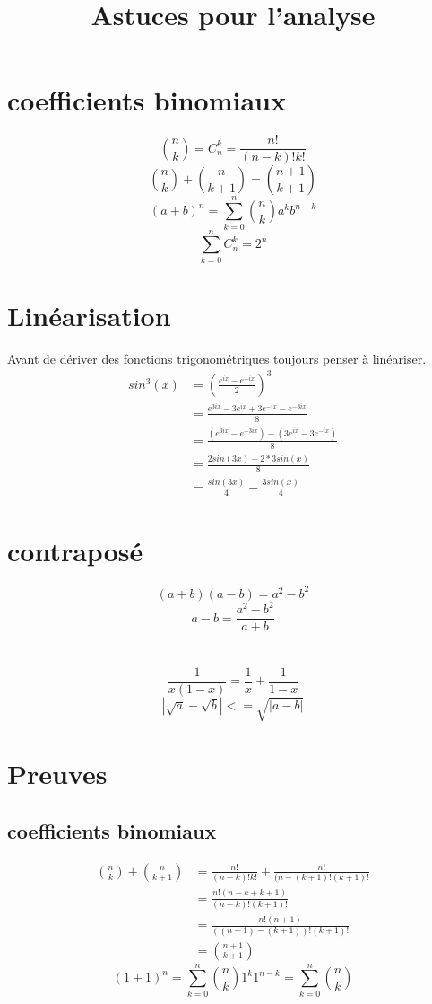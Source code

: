 \documentclass[a4paper,10pt]{article}
\title{Astuces pour l'analyse}
\author{}
\begin{document}
\maketitle

\begin{abstract}

\end{abstract}
\section{coefficients binomiaux}
\[\textstyle{n \choose k} = C^{k}_{n} = \frac{n!}{(n - k)!k!}\]
\[\textstyle{n \choose k} + \textstyle{n \choose k + 1} = \textstyle{n + 1 \choose k + 1}\]
\[(a + b)^{n} = \sum_{k = 0}^{n} \textstyle{n \choose k} a^{k}b^{n - k}\]
\[\sum_{k = 0}^{n} C^{k}_{n} = 2^{n}\]

\section{Linéarisation}
Avant de dériver des fonctions trigonométriques toujours penser à linéariser.
\begin{align*}
sin^{3}(x) &= (\frac{e^{ix} - e^{-ix}}{2})^{3}\\
&= \frac{e^{3ix} - 3e^{ix} + 3e^{-ix} - e^{-3ix}}{8}\\
&= \frac{(e^{3ix} - e^{-3ix}) -(3e^{ix} - 3e^{-ix})}{8}\\
&= \frac{2sin(3x) - 2*3sin(x)}{8}\\
&= \frac{sin(3x)}{4} - \frac{3sin(x)}{4}
\end{align*}
\section{contraposé}
\[(a + b)(a - b) = a^{2} - b^{2}\]
\[a - b = \frac{a^{2} - b^{2}}{a + b}\]
\section{}
\[\frac{1}{x(1 - x)} = \frac{1}{x} + \frac{1}{1 - x}\]
\[|\sqrt{a} - \sqrt{b}| <= \sqrt{|a - b|}\]
\appendix
\section{Preuves}
\subsection{coefficients binomiaux}
\begin{align*}
 \textstyle{n \choose k} + \textstyle{n \choose k + 1} &= \frac{n!}{(n - k)!k!} + \frac{n!}{(n - (k + 1)!(k + 1)!}\\
 &= \frac{n!(n - k + k + 1)}{(n - k)!(k + 1)!}\\
 &= \frac{n!(n + 1)}{((n + 1) - (k + 1))!(k + 1)!}\\
 &= \textstyle{n + 1 \choose k + 1}
\end{align*}
\[(1 + 1)^{n} = \sum_{k = 0}^{n} \textstyle{n \choose k} 1^{k}1^{n - k} = \sum_{k = 0}^{n} \textstyle{n \choose k}\]
\end{document}
